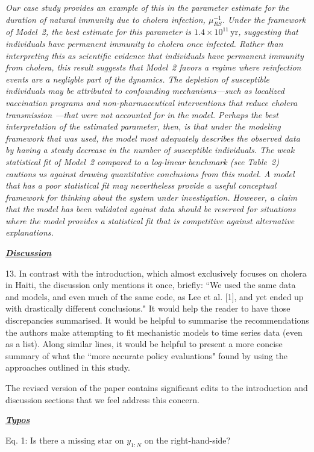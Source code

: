 \documentclass[11pt]{article}
\newcommand\muRS{\mu_{RS}}
\newcommand\report[1]{{\color{mygreen} \vspace{1mm}\hspace{0.25in}\parbox{6in}{\em #1}}}
\newcommand\article[1]{{\color{blue} \vspace{1mm}\hspace{0.25in}\parbox{6in}{\em #1}}}
\begin{document}
\article{Our case study provides an example of this in the parameter estimate for the duration of natural immunity due to cholera infection, $\muRS^{-1}$.
Under the framework of Model~2, the best estimate for this parameter is $1.4 \times 10^{11} \, \mathrm{yr}$, suggesting that individuals have permanent immunity to cholera once infected.
Rather than interpreting this as scientific evidence that individuals have permanent immunity from cholera, this result suggests that Model~2 favors a regime where reinfection events are a negligble part of the dynamics.
The depletion of susceptible individuals may be attributed to confounding mechanisms---such as localized vaccination programs and non-pharmaceutical interventions that reduce cholera transmission \cite{trevisin22, rebaudet21}---that were not accounted for in the model.
Perhaps the best interpretation of the estimated parameter, then, is that under the modeling framework that was used, the model most adequately describes the observed data by having a steady decrease in the number of susceptible individuals.
The weak statistical fit of Model~2 compared to a log-linear benchmark (see Table~2) cautions us against drawing quantitative conclusions from this model.
A model that has a poor statistical fit may nevertheless provide a useful conceptual framework for thinking about the system under investigation.
However, a claim that the model has been validated against data should be reserved for situations where the model provides a statistical fit that is competitive against alternative explanations.}


\report{
  \textbf{\underline{Discussion}}

13. In contrast with the introduction, which almost exclusively focuses on cholera in Haiti, the discussion only mentions it once, briefly: ``We used the same data and models, and even much of the same code, as Lee et al. [1], and yet ended up with drastically different conclusions." It would help the reader to have those discrepancies summarised. It would be helpful to summarise the recommendations the authors make attempting to fit mechanistic models to time series data (even as a list). Along similar lines, it would be helpful to present a more concise summary of what the ``more accurate policy evaluations" found by using the approaches outlined in this study.
}

The revised version of the paper contains significant edits to the introduction and discussion sections that we feel address this concern.

\report{
  \textbf{\underline{Typos}}

  Eq. 1: Is there a missing star on $y_{1:N}$ on the right-hand-side?
}
\end{document}
